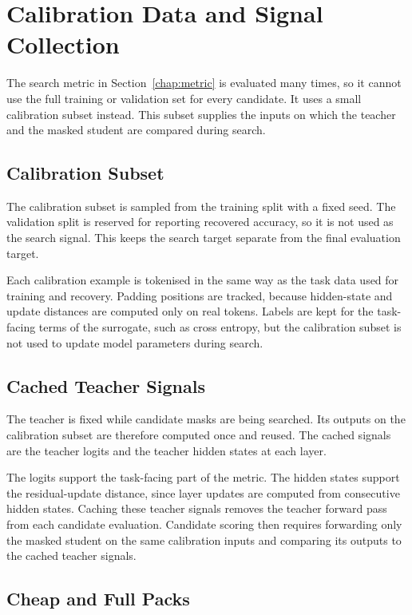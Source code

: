 \section{Calibration Data and Signal Collection}
\label{chap:calibration}

The search metric in Section~\ref{chap:metric} is evaluated many times, so it cannot use the full training or validation set for every candidate. It uses a small calibration subset instead. This subset supplies the inputs on which the teacher and the masked student are compared during search.

\subsection{Calibration Subset}

The calibration subset is sampled from the training split with a fixed seed. The validation split is reserved for reporting recovered accuracy, so it is not used as the search signal. This keeps the search target separate from the final evaluation target.

Each calibration example is tokenised in the same way as the task data used for training and recovery. Padding positions are tracked, because hidden-state and update distances are computed only on real tokens. Labels are kept for the task-facing terms of the surrogate, such as cross entropy, but the calibration subset is not used to update model parameters during search.

\subsection{Cached Teacher Signals}

The teacher is fixed while candidate masks are being searched. Its outputs on the calibration subset are therefore computed once and reused. The cached signals are the teacher logits and the teacher hidden states at each layer.

The logits support the task-facing part of the metric. The hidden states support the residual-update distance, since layer updates are computed from consecutive hidden states. Caching these teacher signals removes the teacher forward pass from each candidate evaluation. Candidate scoring then requires forwarding only the masked student on the same calibration inputs and comparing its outputs to the cached teacher signals.

\subsection{Cheap and Full Packs}

